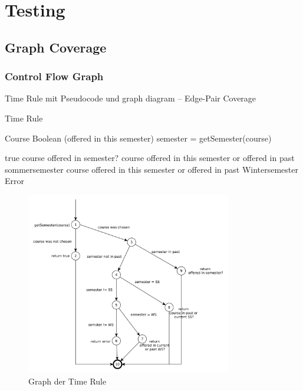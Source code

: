 \documentclass[ngerman]{article}
\begin{document}
\section{Testing}

\subsection{Graph Coverage}

\subsubsection{Control Flow Graph}
Time Rule mit Pseudocode und graph diagram -- Edge-Pair Coverage
\begin{algorithm}
\caption{Time Rule}
\begin{algorithmic}[1]
     Course
    \ENSURE Boolean (offered in this semester)
    \STATE semester = getSemester(course)

    		\RETURN true
    	\ELSE
    			\RETURN course offered in semester?
   	  	\ELSE 
    				\RETURN course offered in this semester or offered in past sommersemester
    			\ELSE
    					\RETURN course offered in this semester or offered in past Wintersemester 
    				\ELSE 
    					\RETURN Error
    				\ENDIF
    			\ENDIF
    		\ENDIF
    	\ENDIF
\end{algorithmic}
\end{algorithm}


\begin{figure}
\includegraphics[width=0.8\textwidth]{figures/time_rule.pdf}
\caption{Graph der Time Rule}
\end{figure}
\end{document}
